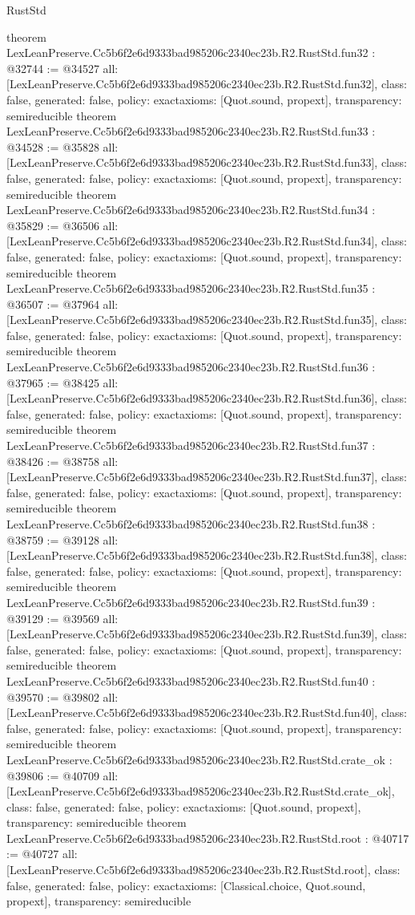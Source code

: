 \begin{lexlean}{RustStd}
\begin{coremodule}
{}
theorem LexLeanPreserve.Cc5b6f2e6d9333bad985206c2340ec23b.R2.RustStd.fun32 : @32744 := @34527 {
  all: [LexLeanPreserve.Cc5b6f2e6d9333bad985206c2340ec23b.R2.RustStd.fun32],
  class: false,
  generated: false,
  policy: exact{axioms: [Quot.sound, propext]},
  transparency: semireducible
}
theorem LexLeanPreserve.Cc5b6f2e6d9333bad985206c2340ec23b.R2.RustStd.fun33 : @34528 := @35828 {
  all: [LexLeanPreserve.Cc5b6f2e6d9333bad985206c2340ec23b.R2.RustStd.fun33],
  class: false,
  generated: false,
  policy: exact{axioms: [Quot.sound, propext]},
  transparency: semireducible
}
theorem LexLeanPreserve.Cc5b6f2e6d9333bad985206c2340ec23b.R2.RustStd.fun34 : @35829 := @36506 {
  all: [LexLeanPreserve.Cc5b6f2e6d9333bad985206c2340ec23b.R2.RustStd.fun34],
  class: false,
  generated: false,
  policy: exact{axioms: [Quot.sound, propext]},
  transparency: semireducible
}
theorem LexLeanPreserve.Cc5b6f2e6d9333bad985206c2340ec23b.R2.RustStd.fun35 : @36507 := @37964 {
  all: [LexLeanPreserve.Cc5b6f2e6d9333bad985206c2340ec23b.R2.RustStd.fun35],
  class: false,
  generated: false,
  policy: exact{axioms: [Quot.sound, propext]},
  transparency: semireducible
}
theorem LexLeanPreserve.Cc5b6f2e6d9333bad985206c2340ec23b.R2.RustStd.fun36 : @37965 := @38425 {
  all: [LexLeanPreserve.Cc5b6f2e6d9333bad985206c2340ec23b.R2.RustStd.fun36],
  class: false,
  generated: false,
  policy: exact{axioms: [Quot.sound, propext]},
  transparency: semireducible
}
theorem LexLeanPreserve.Cc5b6f2e6d9333bad985206c2340ec23b.R2.RustStd.fun37 : @38426 := @38758 {
  all: [LexLeanPreserve.Cc5b6f2e6d9333bad985206c2340ec23b.R2.RustStd.fun37],
  class: false,
  generated: false,
  policy: exact{axioms: [Quot.sound, propext]},
  transparency: semireducible
}
theorem LexLeanPreserve.Cc5b6f2e6d9333bad985206c2340ec23b.R2.RustStd.fun38 : @38759 := @39128 {
  all: [LexLeanPreserve.Cc5b6f2e6d9333bad985206c2340ec23b.R2.RustStd.fun38],
  class: false,
  generated: false,
  policy: exact{axioms: [Quot.sound, propext]},
  transparency: semireducible
}
theorem LexLeanPreserve.Cc5b6f2e6d9333bad985206c2340ec23b.R2.RustStd.fun39 : @39129 := @39569 {
  all: [LexLeanPreserve.Cc5b6f2e6d9333bad985206c2340ec23b.R2.RustStd.fun39],
  class: false,
  generated: false,
  policy: exact{axioms: [Quot.sound, propext]},
  transparency: semireducible
}
theorem LexLeanPreserve.Cc5b6f2e6d9333bad985206c2340ec23b.R2.RustStd.fun40 : @39570 := @39802 {
  all: [LexLeanPreserve.Cc5b6f2e6d9333bad985206c2340ec23b.R2.RustStd.fun40],
  class: false,
  generated: false,
  policy: exact{axioms: [Quot.sound, propext]},
  transparency: semireducible
}
theorem LexLeanPreserve.Cc5b6f2e6d9333bad985206c2340ec23b.R2.RustStd.crate_ok : @39806 := @40709 {
  all: [LexLeanPreserve.Cc5b6f2e6d9333bad985206c2340ec23b.R2.RustStd.crate_ok],
  class: false,
  generated: false,
  policy: exact{axioms: [Quot.sound, propext]},
  transparency: semireducible
}
theorem LexLeanPreserve.Cc5b6f2e6d9333bad985206c2340ec23b.R2.RustStd.root : @40717 := @40727 {
  all: [LexLeanPreserve.Cc5b6f2e6d9333bad985206c2340ec23b.R2.RustStd.root],
  class: false,
  generated: false,
  policy: exact{axioms: [Classical.choice, Quot.sound, propext]},
  transparency: semireducible
}


\end{coremodule}
\end{lexlean}
